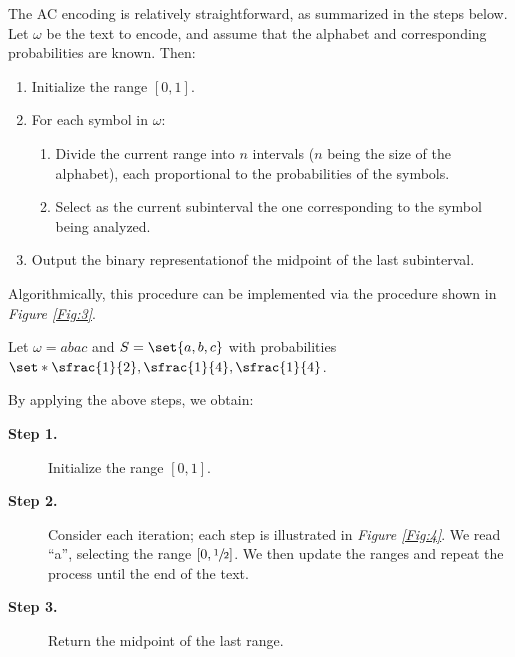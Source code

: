 \documentclass{subfiles}
\begin{document}
 
    The AC encoding is relatively straightforward, as summarized in the steps below.
    Let \(\omega\) be the text to encode, and assume that the alphabet
        and corresponding probabilities are known. Then:
        \begin{enumerate}
            \item Initialize the range \([0, 1]\).

            \item For each symbol in \(\omega\):
                \begin{enumerate}
                    \item Divide the current range into \(n\) intervals 
                        (\(n\) being the size of the alphabet), 
                        each proportional to the probabilities of the symbols.

                    \item Select as the current subinterval the one corresponding to the symbol
                        being analyzed.
                \end{enumerate}
            \item Output the binary representation\footnotemark of the midpoint of the last subinterval.
        \end{enumerate}

        Algorithmically, this procedure can be implemented via the procedure shown in \emph{Figure \ref{Fig:3}}.
        \clearpage
        

        \begin{example*}
            Let \(\omega = abac\) and \(S = \set{a, b, c}\)
            with probabilities \(\set*{\sfrac{1}{2}, \sfrac{1}{4}, \sfrac{1}{4}}\).

            By applying the above steps, we obtain:
            \begin{description}
                \item [\textbf{Step 1.}] Initialize the range \([0, 1]\).

                \item [\textbf{Step 2.}] Consider each iteration; 
                    each step is illustrated in \emph{Figure \ref{Fig:4}}.
                    We read ``a'', selecting the range \([0, \sfrac{1}{2}]\).
                    We then update the ranges and repeat the process until the end of the text.
                    

                \item [\textbf{Step 3.}] Return the midpoint of the last range.
            \end{description}
        \end{example*}
\end{document}
